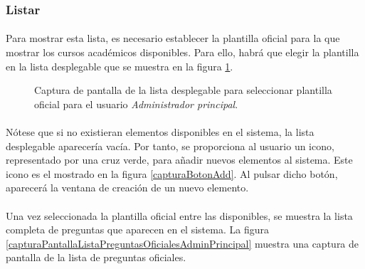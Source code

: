 \subsubsection{Listar}

  \paragraph{}Para mostrar esta lista, es necesario establecer la plantilla
  oficial para la que mostrar los cursos académicos disponibles. Para ello,
  habrá que elegir la plantilla en la lista desplegable que se muestra en la
  figura \ref{capturaPantallaSelectPlantillaOficial}.

  \begin{figure}[!ht]
    \begin{center}
      \caption{Captura de pantalla de la lista desplegable para seleccionar plantilla oficial para el usuario \textit{Administrador principal}.}
      \label{capturaPantallaSelectPlantillaOficial}
    \end{center}
  \end{figure}

  \paragraph{}Nótese que si no existieran elementos disponibles en el sistema,
  la lista desplegable aparecería vacía. Por tanto, se proporciona al usuario
  un icono, representado por una cruz verde, para añadir nuevos elementos al
  sistema. Este icono es el mostrado en la figura \ref{capturaBotonAdd}. Al
  pulsar dicho botón, aparecerá la ventana de creación de un nuevo elemento.

  \paragraph{}Una vez seleccionada la plantilla oficial entre las disponibles,
  se muestra la lista completa de preguntas que aparecen en el sistema. La
  figura \ref{capturaPantallaListaPreguntasOficialesAdminPrincipal} muestra una
  captura de pantalla de la lista de preguntas oficiales.

